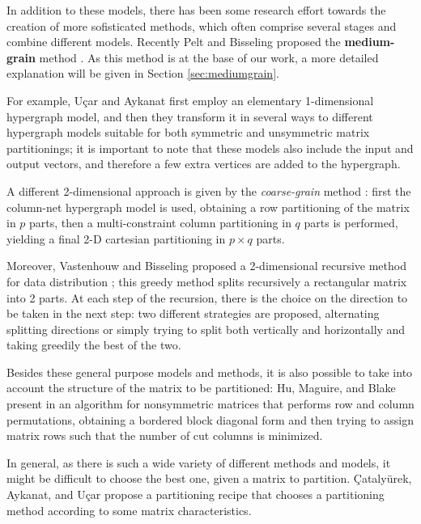 In addition to these models, there has been some research effort towards the creation of more sofisticated methods, which often comprise several stages and combine different models. Recently Pelt and Bisseling proposed the \textbf{medium-grain} method \cite{mediumgrain}.  As this method is at the base of our work, a more detailed explanation will be given in Section \ref{sec:mediumgrain}.

For example, Uçar and Aykanat \cite{hypergraph_revisiting} first employ an elementary 1-dimensional hypergraph model, and then they transform it in several ways to different hypergraph models suitable for both symmetric and unsymmetric matrix partitionings; it is important to note that these models also include the input and output vectors, and therefore a few extra vertices are added to the hypergraph.

A different 2-dimensional approach is given by the \emph{coarse-grain} method \cite{hypergraph_coarsegrain}: first the column-net hypergraph model is used, obtaining a row partitioning of the matrix in $p$ parts, then a multi-constraint column partitioning in $q$ parts is performed, yielding a final 2-D cartesian partitioning in $p \times q$ parts. 

Moreover, Vastenhouw and Bisseling proposed a 2-dimensional recursive method for data distribution \cite{mondriaan}; this greedy method splits recursively a rectangular matrix into 2 parts.
At each step of the recursion, there is the choice on the direction to be taken in the next step: two different strategies are proposed, alternating splitting directions or simply trying to split both vertically and horizontally and taking greedily the best of the two.

Besides these general purpose models and methods, it is also possible to take into account the structure of the matrix to be partitioned: Hu, Maguire, and Blake present in \cite{hu2000} an algorithm for nonsymmetric matrices that performs row and column permutations, obtaining a bordered block diagonal form and then trying to assign matrix rows such that the number of cut columns is minimized.

In general, as there is such a wide variety of different methods and models, it might be difficult to choose the best one, given a matrix to partition. {\c{C}}ataly{\"u}rek, Aykanat, and U{\c{c}}ar propose a partitioning recipe \cite{catalyurek_recipe} that chooses a partitioning method according to some matrix characteristics.

